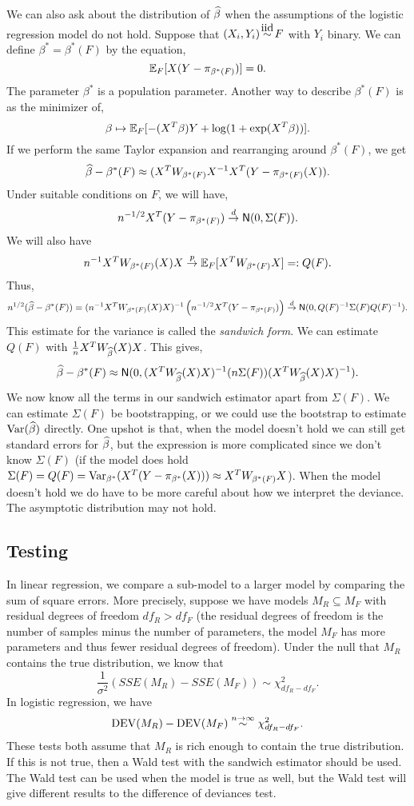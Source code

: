 We can also ask about the distribution of $\widehat{\beta}$ when the assumptions of the logistic regression model do not hold. Suppose that $(X_i,Y_i)\iid F$ with $Y_i$ binary. We can define $\beta^* = \beta^*(F)$ by the equation,
\[{\mathbb{E}}_F[X(Y-\pi_{\beta^*(F)})] = 0. \]
The parameter $\beta^*$ is a population parameter. Another way to describe $\beta^*(F)$ is as the minimizer of,
\[\beta \mapsto {\mathbb{E}}_F[-(X^T\beta)Y+\log(1+\exp(X^T\beta))]. \]
If we perform the same Taylor expansion and rearranging around $\beta^*(F)$, we get
\[\widehat{\beta}-\beta^*(F) \approx (X^TW_{\beta^*(F)}X^{-1}X^T(Y-\pi_{\beta^*(F)}(X)).\]
Under suitable conditions on $F$, we will have,
\[n^{-1/2}X^T(Y-\pi_{\beta^*(F)}) \stackrel{d}{\to} \mathsf{N}(0,\Sigma(F)).\]
We will also have
\[n^{-1}X^TW_{\beta^*(F)}(X)X \stackrel{p}{\to} {\mathbb{E}}_F[X^TW_{\beta^*(F)}X] =: Q(F). \]
Thus,
\[n^{1/2}(\widehat{\beta}-\beta^*(F)) = (n^{-1}X^TW_{\beta^*(F)}(X)X)^{-1}\left(n^{-1/2}X^T(Y-\pi_{\beta^*(F)})\right) \stackrel{d}{\to} \mathsf{N}(0,Q(F)^{-1}\Sigma(F)Q(F)^{-1}). \]
This estimate for the variance is called the \emph{sandwich form}. We can estimate $Q(F)$ with $\frac{1}{n}X^TW_{\widehat{\beta}}(X)X$. This gives,
\[\widehat{\beta}-\beta^*(F) \approx \mathsf{N}(0, (X^TW_{\widehat{\beta}}(X)X)^{-1}(n\Sigma(F))(X^TW_{\widehat{\beta}}(X)X)^{-1}). \]
We now know all the terms in our sandwich estimator apart from $\Sigma(F)$. We can estimate $\Sigma(F)$ be bootstrapping, or we could use the bootstrap to estimate $\operatorname{Var}(\widehat{\beta})$ directly. One upshot is that, when the model doesn't  hold we can still get standard errors for $\widehat{\beta}$, but the expression is more complicated since we don't know $\Sigma(F)$ (if the model does hold $\Sigma(F) = Q(F) = \operatorname{Var}_{\beta^*}(X^T(Y-\pi_{\beta^*}(X))) \approx X^TW_{\beta^*(F)}X$).  When the model doesn't hold we do have to be  more careful about how we interpret the deviance. The asymptotic distribution may not hold.

\subsection{Testing}
In linear regression, we compare a sub-model to a larger model by comparing the sum of square errors. More precisely, suppose we have models $M_R \subseteq M_F$ with residual degrees of freedom $df_{R} > df_{F}$ (the residual degrees of freedom is the number of samples minus the number of parameters,  the model $M_F$ has more parameters and thus fewer residual degrees of  freedom). Under the null that $M_R$ contains the true distribution, we know that
\[\frac{1}{\sigma^2}\left(SSE(M_R)-SSE(M_F)\right) \sim \chi^2_{df_R-df_F}. \] 
In logistic regression, we have
\[\operatorname{DEV}(M_R)-\operatorname{DEV}(M_F) \stackrel{n \to \infty}{\sim} \chi^2_{df_R-df_F}. \]
These tests both assume that $M_R$ is rich enough to contain the true distribution. If this is not true, then a Wald test with the sandwich estimator should be used. The Wald test can be used when the model is true as well, but the Wald test will give different results to the  difference of deviances test.
